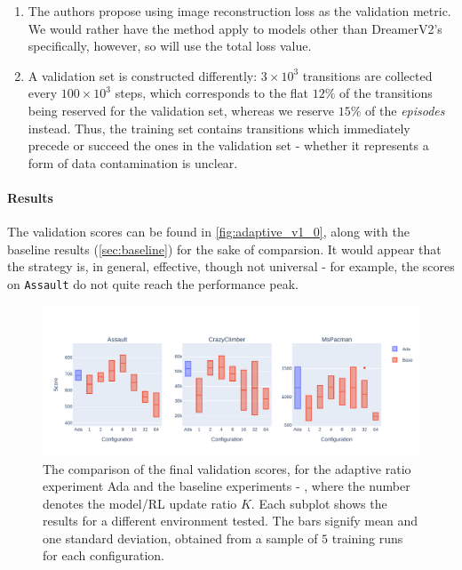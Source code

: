 \documentclass[en]{pracamgr}
\newcommand{\env}[1]{{\tt #1}}
\newcommand{\figurewidth}{\linewidth}
\newcommand{\figureheight}{0.8\paperheight}
\begin{document}
\begin{enumerate}
  \item The authors propose using image reconstruction loss as the validation metric. We would rather have the method apply to models other than DreamerV2's specifically, however, so will use the total loss value.
  \item A validation set is constructed differently: $3 \times 10^3$ transitions are collected every $100 \times 10^3$ steps, which corresponds to the flat $12 \%$ of the transitions being reserved for the validation set, whereas we reserve $15 \%$ of the \emph{episodes} instead. Thus, the training set contains transitions which immediately precede or succeed the ones in the validation set - whether it represents a form of data contamination is unclear.
\end{enumerate}

\paragraph{Results} The validation scores can be found in \autoref{fig:adaptive_v1_0}, along with the baseline results (\autoref{sec:baseline}) for the sake of comparsion. It would appear that the strategy is, in general, effective, though not universal - for example, the scores on \env{Assault} do not quite reach the performance peak.

\begin{figure}
  \centering
  \includegraphics[width=\figurewidth,height=\figureheight,keepaspectratio]{assets/adaptive_v1_0.pdf}
  \caption{The comparison of the final validation scores, for the adaptive ratio experiment {\sf Ada} and the baseline experiments {} - {}, where the number denotes the model/RL update ratio $K$. Each subplot shows the results for a different environment tested. The bars signify mean and one standard deviation, obtained from a sample of $5$ training runs for each configuration.}
  \label{fig:adaptive_v1_0}
\end{figure}
\end{document}
